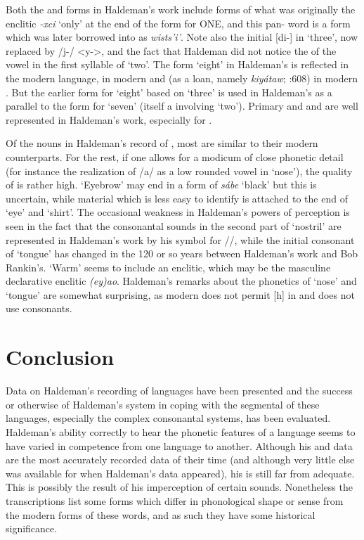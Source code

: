 \documentclass[output=paper]{LSP/langsci}
\begin{document}
Both the  and  forms in Haldeman's work include forms of what was originally the enclitic \textit{-xci} `only' at the end of the form for ONE, and this pan- word is a form which was later borrowed into  as \textit{wists'i'}.  Note also the initial [di-] in  `three', now replaced by /j-/ <y->, and the fact that Haldeman did not notice the  of the vowel in the first syllable of  `two'.  The form `eight' in Haldeman's  is reflected in the modern language, in modern  and (as a loan, namely \textit{kiy\'ataw}; \citealt{Rood1996}:608) in modern . But the earlier form for `eight' based on `three' is used in Haldeman's  as a parallel to the form for `seven' (itself a  involving `two'). Primary  and  and  are well represented in Haldeman's work, especially for .  

Of the nouns in Haldeman's record of , most are similar to their modern counterparts.  For the rest, if one allows for a modicum of close phonetic detail (for instance the realization of /a/ as a low rounded vowel in `nose'), the quality of  is rather high. `Eyebrow' may end in a form of \textit{s\'abe} `black' but this is uncertain, while material which is less easy to identify is attached to the end of `eye' and `shirt'.  The occasional weakness in Haldeman's powers of perception is seen in the fact that the consonantal sounds in the second part of `nostril' are represented in Haldeman's work by his symbol for //, while the initial consonant of `tongue' has changed in the 120 or so years between Haldeman's work and Bob Rankin's.  `Warm' seems to include an enclitic, which may be the masculine declarative enclitic \textit{(ey)ao}.  Haldeman's remarks about the phonetics of `nose' and `tongue' are somewhat surprising, as modern  does not permit [h] in  and does not use  consonants.


\section{Conclusion}
Data on Haldeman's recording of  languages have been presented and the success or otherwise of Haldeman's system in coping with the segmental  of these languages, especially the complex consonantal systems, has been evaluated. Haldeman's ability correctly to hear the phonetic features of a language seems to have varied in competence from one language to another.  Although his  and  data are the most accurately recorded  data of their time (and although very little else was available for  when Haldeman's data appeared), his  is still far from adequate.  This is possibly the result of his imperception of certain sounds.  Nonetheless the transcriptions list some forms which differ in phonological shape or sense from the modern forms of these words, and as such they have some historical significance. 
\end{document}

